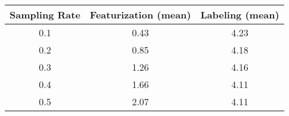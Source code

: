 \begin{tabular}{ccc}
\toprule
 Sampling Rate &  Featurization (mean) &  Labeling (mean) \\
\midrule
           0.1 &                  0.43 &             4.23 \\
           0.2 &                  0.85 &             4.18 \\
           0.3 &                  1.26 &             4.16 \\
           0.4 &                  1.66 &             4.11 \\
           0.5 &                  2.07 &             4.11 \\
\bottomrule
\end{tabular}
